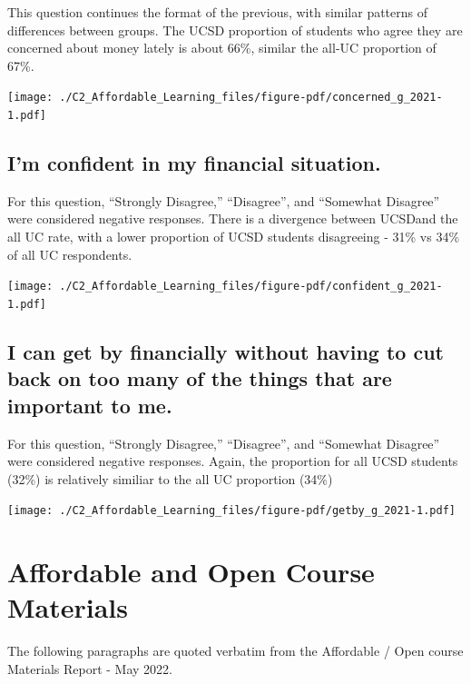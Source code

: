 \documentclass[
  letterpaper,
  DIV=11,
  numbers=noendperiod]{scrreprt}
\begin{document}
This question continues the format of the previous, with similar
patterns of differences between groups. The UCSD proportion of students
who agree they are concerned about money lately is about 66\%, similar
the all-UC proportion of 67\%.

\texttt{[image: ./C2\_Affordable\_Learning\_files/figure-pdf/concerned\_g\_2021-1.pdf]}

\hypertarget{im-confident-in-my-financial-situation.}{%
\subsection{I'm confident in my financial
situation.}\label{im-confident-in-my-financial-situation.}}

For this question, ``Strongly Disagree,'' ``Disagree'', and ``Somewhat
Disagree'' were considered negative responses. There is a divergence
between UCSDand the all UC rate, with a lower proportion of UCSD
students disagreeing - 31\% vs 34\% of all UC respondents.

\texttt{[image: ./C2\_Affordable\_Learning\_files/figure-pdf/confident\_g\_2021-1.pdf]}

\hypertarget{i-can-get-by-financially-without-having-to-cut-back-on-too-many-of-the-things-that-are-important-to-me.}{%
\subsection{I can get by financially without having to cut back on too
many of the things that are important to
me.}\label{i-can-get-by-financially-without-having-to-cut-back-on-too-many-of-the-things-that-are-important-to-me.}}

For this question, ``Strongly Disagree,'' ``Disagree'', and ``Somewhat
Disagree'' were considered negative responses. Again, the proportion for
all UCSD students (32\%) is relatively similiar to the all UC proportion
(34\%)

\texttt{[image: ./C2\_Affordable\_Learning\_files/figure-pdf/getby\_g\_2021-1.pdf]}

\hypertarget{affordable-and-open-course-materials}{%
\section{Affordable and Open Course
Materials}\label{affordable-and-open-course-materials}}

The following paragraphs are quoted verbatim from the Affordable / Open
course Materials Report - May 2022.
\end{document}
